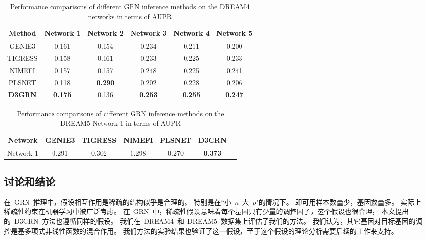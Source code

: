 \begin{table}[!htbp]
  \centering
  \begin{threeparttable}  
  \caption{Performance comparisons of different GRN inference methods on the DREAM4 networks in terms of AUPR}
  \label{tab:performance_dr4} 
    \begin{tabular}{cccccc}  
    \toprule  
    Method
     & Network 1&  Network 2&  Network 3&  Network 4 & Network 5\\
    \midrule  
    GENIE3  &0.161   &0.154           &0.234      &0.211          &0.200                 \\
    TIGRESS &0.158   &0.161           &0.233      &0.225          &0.233                \\
    NIMEFI  &0.157   &0.157           &0.248      &0.225          &0.241                \\
    PLSNET  &0.118   &\textbf{0.290}  &0.202      &0.228          &0.206                \\
    \textbf{D3GRN}   &\textbf{0.175}  &0.136      &\textbf{0.253} &\textbf{0.255}       &\textbf{0.247}  \\
    \bottomrule  
    \end{tabular}  
   \end{threeparttable}
\end{table} 

\begin{table}[!htbp]
  \begin{threeparttable}  
  \caption{Performance comparisons of different GRN inference methods on the DREAM5 Network 1 in terms of AUPR}  
  \label{tab:performance_dr5} 
    \begin{tabular}{ccccccc}  
    \toprule  
    Network&GENIE3 &TIGRESS &NIMEFI  &PLSNET &\textbf{D3GRN}\\
    \midrule  
    Network 1&0.291 &0.302 &0.298 &0.270  &\textbf{0.373}\\
    \bottomrule  
    \end{tabular}  
    \end{threeparttable}
\end{table} 


\subsection{讨论和结论}

在~GRN~推理中，假设相互作用是稀疏的结构似乎是合理的。
特别是在``小~$n$~大~$p$"的情况下。
即可用样本数量少，基因数量多。
实际上稀疏性约束在机器学习中被广泛考虑。
在~GRN~中，稀疏性假设意味着每个基因只有少量的调控因子，这个假设也很合理，
本文提出的~D3GRN~方法也遵循同样的假设。
我们在~DREAM4~和~DREAM5~数据集上评估了我们的方法。
我们认为，其它基因对目标基因的调控是基多项式非线性函数的混合作用。
我们方法的实验结果也验证了这一假设，至于这个假设的理论分析需要后续的工作来支持。